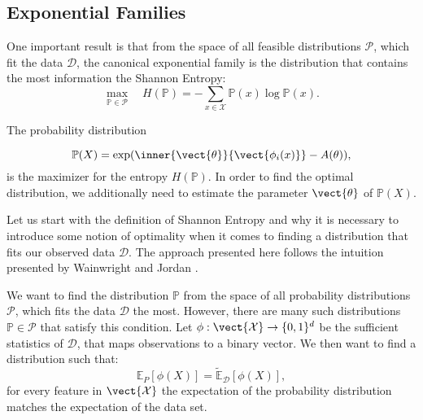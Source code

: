     
    \subsection{Exponential Families}
    \label{ssec:expf}
    One important result is that from the space of all feasible distributions $\mathcal{P}$, which fit the data $\mathcal{D}$, the canonical exponential family is the distribution that contains the most information \wrt the Shannon Entropy:
    \begin{equation}
    \max_{\mathbb{P}\in \mathcal{P}} \quad  H(\mathbb{P}) = - \sum_{x\in\mathcal{X}} \mathbb{P}(x) \log \mathbb{P}(x).
    \end{equation}

    The probability distribution

    \begin{equation}
        \mathbb{P}(X) = \exp(\inner{\vect{\theta}}{\vect{\phi_i(x)}} - A(\theta)),
    \end{equation}
    is the maximizer for the entropy $H(\mathbb{P})$.
    In order to find the optimal distribution, we additionally need to estimate the parameter $\vect{\theta}$ of $\mathbb{P}(X)$.

    Let us start with the definition of Shannon Entropy and why it is necessary to introduce some notion of optimality when it comes to finding a distribution that fits our observed data $\mathcal{D}$.
    The approach presented here follows the intuition presented by Wainwright and Jordan \cite{wainwright2008graphical}.

    We want to find the distribution $\mathbb{P}$ from the space of all probability distributions $\mathcal{P}$, which fits the data  $\mathcal{D}$ the most.
    However,  there are many such distributions $\mathbb{P} \in \mathcal{P}$ that satisfy this condition. 
    Let $\phi: \vect{\mathcal{X}}  \rightarrow \{0,1\}^d$ be the sufficient statistics of $\mathcal{D}$, that maps observations to a binary vector. 
    We then want to find a distribution such that:
    \begin{equation}
        \label{eq:expecval}
        \mathbb{E}_P[\phi(X)] = \tilde{\mathbb{E}}_{\mathcal{D}}[\phi(X)], 
    \end{equation}
    for every feature in $\vect{\mathcal{X}}$ the expectation of the probability distribution matches the expectation of the data set.

